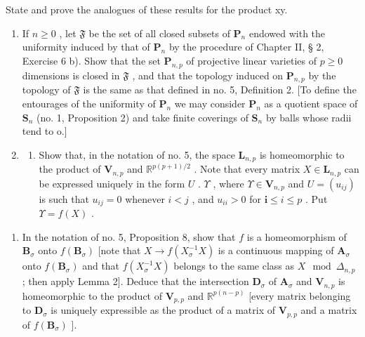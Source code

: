 State and prove the analogues of these results for the product xy.

\begin{enumerate}
\def\labelenumi{\arabic{enumi})}
\setcounter{enumi}{5}
\item
  If \(n \geqslant 0\) , let \(\mathfrak{F}\) be the set of all closed subsets of \(\mathbf{P}_n\) endowed with the uniformity induced by that of \(\mathbf{P}_n\) by the procedure of Chapter II, § 2, Exercise 6 b). Show that the set \(\mathbf{P}_{n,p}\) of projective linear varieties of \(p \geqslant 0\) dimensions is closed in \(\mathfrak{F}\) , and that the topology induced on \(\mathbf{P}_{n,p}\) by the topology of \(\mathfrak{F}\) is the same as that defined in no. 5, Definition 2. {[}To define the entourages of the uniformity of \(\mathbf{P}_n\) we may consider \(\mathbf{P}_n\) as a quotient space of \(\mathbf{S}_n\) (no. 1, Proposition 2) and take finite coverings of \(\mathbf{S}_n\) by balls whose radii tend to o.{]}
\item
  \begin{enumerate}
  \def\labelenumii{\alph{enumii})}
  \tightlist
  \item
    Show that, in the notation of no. 5, the space \(\mathbf{L}_{n,p}\) is homeomorphic to the product of \(\mathbf{V}_{n,p}\) and \(\mathbb{R}^{p(p+1)/2}\) . Note that every matrix \(X\in\mathbf{L}_{n,p}\) can be expressed uniquely in the form \(U\) . \(\Upsilon\) , where \(\Upsilon\in\mathbf{V}_{n,p}\) and \(U=(u_{ij})\) is such that \(u_{ij}=0\) whenever \(i<j\) , and \(u_{ii}>0\) for \(\mathbf{i}\leqslant i\leqslant p\) . Put \(\Upsilon=f(X)\) .
  \end{enumerate}
\end{enumerate}

\begin{enumerate}
\def\labelenumi{\alph{enumi})}
\setcounter{enumi}{1}
\tightlist
\item
  In the notation of no. 5, Proposition 8, show that \(f\) is a homeomorphism of \(\mathbf{B}_{\sigma}\) onto \(f(\mathbf{B}_{\sigma})\) {[}note that \(X \to f(X_{\sigma}^{-1}X)\) is a continuous mapping of \(\mathbf{A}_{\sigma}\) onto \(f(\mathbf{B}_{\sigma})\) and that \(f(X_{\sigma}^{-1}X)\) belongs to the same class as \(X \mod \Delta_{n,p}\) ; then apply Lemma 2{]}. Deduce that the intersection \(\mathbf{D}_{\sigma}\) of \(\mathbf{A}_{\sigma}\) and \(\mathbf{V}_{n,p}\) is homeomorphic to the product of \(\mathbf{V}_{p,p}\) and \(\mathbb{R}^{p(n - p)}\) {[}every matrix belonging to \(\mathbf{D}_{\sigma}\) is uniquely expressible as the product of a matrix of \(\mathbf{V}_{p,p}\) and a matrix of \(f(\mathbf{B}_{\sigma})\) {]}.
\end{enumerate}

